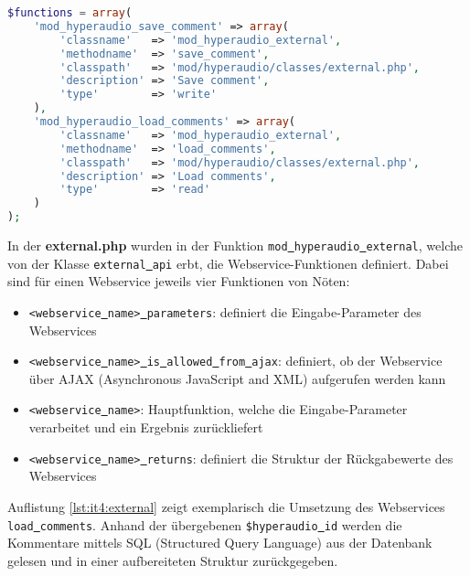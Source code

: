 \begin{lstlisting}[language=php,
             linewidth=\textwidth,
             caption={Ausschnitt der \textbf{services.php} in der 4. Iteration},
             label={lst:it4:services}]
$functions = array(
    'mod_hyperaudio_save_comment' => array(
        'classname'   => 'mod_hyperaudio_external',
        'methodname'  => 'save_comment',
        'classpath'   => 'mod/hyperaudio/classes/external.php',
        'description' => 'Save comment',
        'type'        => 'write'
    ),
    'mod_hyperaudio_load_comments' => array(
        'classname'   => 'mod_hyperaudio_external',
        'methodname'  => 'load_comments',
        'classpath'   => 'mod/hyperaudio/classes/external.php',
        'description' => 'Load comments',
        'type'        => 'read'
    )
);
\end{lstlisting}

In der \textbf{external.php} wurden in der Funktion \texttt{mod\underline{{ }}hyperaudio\underline{{ }}external}, welche von der Klasse \texttt{external\underline{{ }}api} erbt, die Webservice-Funktionen definiert. Dabei sind für einen Webservice jeweils vier Funktionen von Nöten:

\begin{itemize}
\item \texttt{<webservice\underline{{ }}name>\underline{{ }}parameters}: definiert die Eingabe-Parameter des Webservices
\item \texttt{<webservice\underline{{ }}name>\underline{{ }}is\underline{{ }}allowed\underline{{ }}from\underline{{ }}ajax}: definiert, ob der Webservice über AJAX (Asynchronous JavaScript and XML) aufgerufen werden kann
\item \texttt{<webservice\underline{{ }}name>}: Hauptfunktion, welche die Eingabe-Parameter verarbeitet und ein Ergebnis zurückliefert
\item \texttt{<webservice\underline{{ }}name>\underline{{ }}returns}: definiert die Struktur der Rückgabewerte des Webservices
\end{itemize}

Auflistung \ref{lst:it4:external} zeigt exemplarisch die Umsetzung des Webservices \texttt{load\underline{{ }}comments}. Anhand der übergebenen \texttt{\$hyperaudio\underline{{ }}id} werden die Kommentare mittels SQL (Structured Query Language) aus der Datenbank gelesen und in einer aufbereiteten Struktur zurückgegeben.

